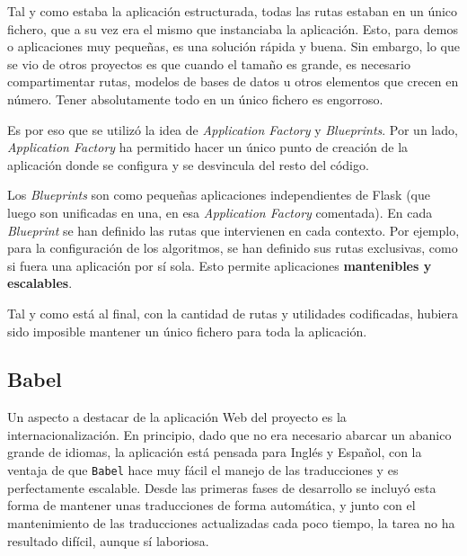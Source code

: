 Tal y como estaba la aplicación estructurada, todas las rutas estaban en un
único fichero, que a su vez era el mismo que instanciaba la aplicación. Esto,
para demos o aplicaciones muy pequeñas, es una solución rápida y buena. Sin
embargo, lo que se vio de otros proyectos es que cuando el tamaño es grande, es
necesario compartimentar rutas, modelos de bases de datos u otros elementos que
crecen en número. Tener absolutamente todo en un único fichero es engorroso.

Es por eso que se utilizó la idea de \textit{Application Factory} y
\textit{Blueprints}. Por un lado, \textit{Application Factory} ha permitido
hacer un único punto de creación de la aplicación donde se configura y se
desvincula del resto del código.

Los \textit{Blueprints} son como pequeñas aplicaciones independientes de Flask
(que luego son unificadas en una, en esa \textit{Application Factory}
comentada). En cada \textit{Blueprint} se han definido las rutas que intervienen
en cada contexto. Por ejemplo, para la configuración de los algoritmos, se han
definido sus rutas exclusivas, como si fuera una aplicación por sí sola. Esto
permite aplicaciones \textbf{mantenibles y escalables}.

Tal y como está al final, con la cantidad de rutas y utilidades codificadas,
hubiera sido imposible mantener un único fichero para toda la aplicación.

\subsection{Babel}

Un aspecto a destacar de la aplicación Web del proyecto es la
internacionalización. En principio, dado que no era necesario abarcar un abanico
grande de idiomas, la aplicación está pensada para Inglés y Español, con la
ventaja de que \texttt{Babel} hace muy fácil el manejo de las traducciones y es
perfectamente escalable. Desde las primeras fases de desarrollo se incluyó esta
forma de mantener unas traducciones de forma automática, y junto con el
mantenimiento de las traducciones actualizadas cada poco tiempo, la tarea no ha
resultado difícil, aunque sí laboriosa.